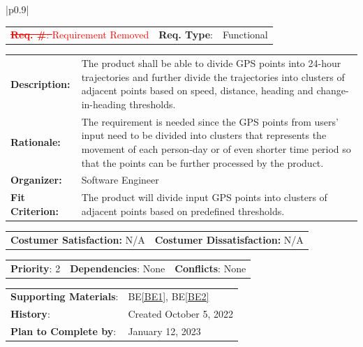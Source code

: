 \documentclass[12pt, titlepage]{article}
\newcommand{\beref}[1]{BE\ref{#1}}
\newcounter{reqnum}
\newcommand{\reqthereqnum}{\textbf{Req. \#}: \thereqnum}
\newenvironment{boxed}
    {\begin{center}
    \begin{tabular}{|p{0.9\textwidth}|}
    \hline\\
    }
    { 
    \\\\\hline
    \end{tabular} 
    \end{center}
    }
\begin{document}
\begin{boxed}
\begin{tabular}{l r r}
 \textcolor{red}{\sout{{reqnum} \reqthereqnum \label{Req3}} Requirement Removed} & {\bf Req. Type}: &  Functional\\
\end{tabular}
\newline
\begin{tabular}{l p{11.5cm}}
    {\bf Description:} & The product shall be able to divide GPS points into 24-hour trajectories and further divide the trajectories into clusters of adjacent points based on speed, distance, heading and change-in-heading thresholds.  \\
    {\bf Rationale:} & The requirement is needed since the GPS points from users' input need to be divided into clusters that represents the movement of each person-day or of even shorter time period so that the points can be further processed by the product.\\
    {\bf Organizer:} & Software Engineer\\
    {\bf Fit Criterion:} & The product will divide input GPS points into clusters of adjacent points based on predefined thresholds.\\
\end{tabular}
\begin{tabular}{l r}
{\bf Costumer Satisfaction:} N/A &  {\bf Costumer Dissatisfaction:}  N/A\\
\end{tabular}
\begin{tabular}{l r r}
    {\bf Priority}: 2 & {\bf Dependencies}: None  & {\bf Conflicts}: None \\
\end{tabular}
\begin{tabular}{l l}
     {\bf Supporting Materials}:& 
     \beref{BE1}, \beref{BE2} \\ 
     {\bf History}: & Created October 5, 2022\\
     {\bf Plan to Complete by}: & January 12, 2023\\
\end{tabular}
\end{boxed}
\end{document}
